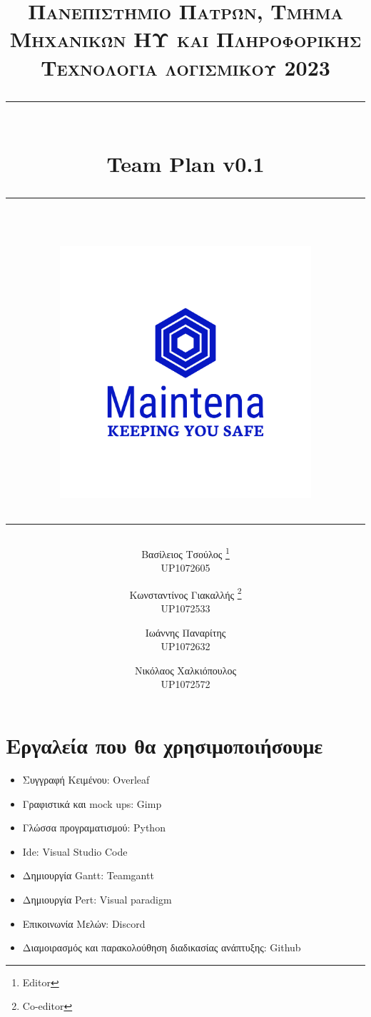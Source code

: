 \documentclass[11pt]{scrartcl} %
\title{	
	\normalfont\normalsize
	\textsc{Πανεπιστήμιο Πατρών, Τμήμα Μηχανικών ΗΥ και Πληροφορικής \\Τεχνολογία λογισμικού 2023}\\ %
	\vspace{25pt} %
	\rule{\linewidth}{0.5pt}\\ %
	\vspace{20pt} %
    {\Large Team Plan v0.1}\\ %
	\vspace{12pt} %
	\rule{\linewidth}{0.5pt}\\ %
	\vspace{12pt} %
    \includegraphics[width=0.7\textwidth]{../../brand/png/logo-transparent.png}
        \rule{\linewidth}{2pt}
}
\author{
Βασίλειος Τσούλος \thanks{Editor} \\UP1072605 \and Κωνσταντίνος Γιακαλλής \thanks{Co-editor} \\UP1072533
\and \hspace{-1ex} Ιωάννης Παναρίτης \\ \hspace{-1ex} UP1072632  \and Νικόλαος Χαλκιόπουλος \\UP1072572
}
\date{} %
\begin{document}
\maketitle
\pagebreak

\tableofcontents
\Large

\section{Εργαλεία που θα χρησιμοποιήσουμε}
\begin{itemize}
    \item Συγγραφή Κειμένου: Overleaf
    \item Γραφιστικά και mock ups: Gimp
    \item Γλώσσα προγραματισμού: Python
    \item Ide: Visual Studio Code
    \item Δημιουργία Gantt: Teamgantt
    \item Δημιουργία Pert: Visual paradigm
    \item Επικοινωνία Μελών: Discord
    \item Διαμοιρασμός και παρακολούθηση διαδικασίας ανάπτυξης: Github
\end{itemize}
\pagebreak
\end{document}

